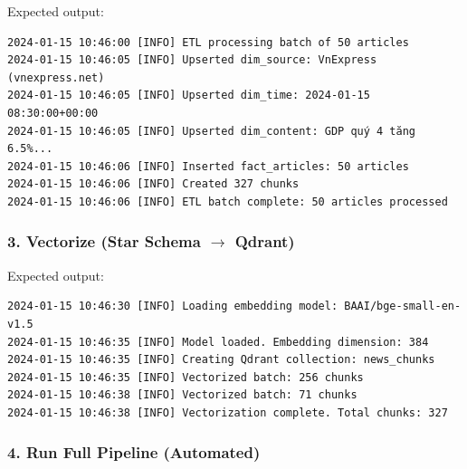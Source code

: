 \begin{Shaded}
\begin{Highlighting}[]
\end{Highlighting}
\end{Shaded}

Expected output:

\begin{verbatim}
2024-01-15 10:46:00 [INFO] ETL processing batch of 50 articles
2024-01-15 10:46:05 [INFO] Upserted dim_source: VnExpress (vnexpress.net)
2024-01-15 10:46:05 [INFO] Upserted dim_time: 2024-01-15 08:30:00+00:00
2024-01-15 10:46:05 [INFO] Upserted dim_content: GDP quý 4 tăng 6.5%...
2024-01-15 10:46:06 [INFO] Inserted fact_articles: 50 articles
2024-01-15 10:46:06 [INFO] Created 327 chunks
2024-01-15 10:46:06 [INFO] ETL batch complete: 50 articles processed
\end{verbatim}

\hypertarget{vectorize-star-schema-rightarrow-qdrant}{%
\subsubsection{\texorpdfstring{3. Vectorize (Star Schema \(\rightarrow\)
Qdrant)}{3. Vectorize (Star Schema \textbackslash rightarrow Qdrant)}}}

\begin{Shaded}
\begin{Highlighting}[]
\end{Highlighting}
\end{Shaded}

Expected output:

\begin{verbatim}
2024-01-15 10:46:30 [INFO] Loading embedding model: BAAI/bge-small-en-v1.5
2024-01-15 10:46:35 [INFO] Model loaded. Embedding dimension: 384
2024-01-15 10:46:35 [INFO] Creating Qdrant collection: news_chunks
2024-01-15 10:46:35 [INFO] Vectorized batch: 256 chunks
2024-01-15 10:46:38 [INFO] Vectorized batch: 71 chunks
2024-01-15 10:46:38 [INFO] Vectorization complete. Total chunks: 327
\end{verbatim}

\hypertarget{run-full-pipeline-automated}{%
\subsubsection{4. Run Full Pipeline
(Automated)}}

